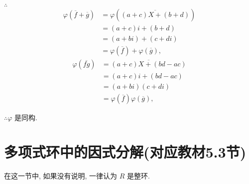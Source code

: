 \documentclass[UTF8]{ctexart}
\begin{document}
\begin{example}
    $\therefore$
    \begin{align*}
        \varphi(\overline{f}+\overline{g}) & =\varphi(\overline{(a+c)X+(b+d)}) \\
        & =(a+c)i+(b+d) \\
        & =(a+bi)+(c+di) \\
        & =\varphi(\overline{f})+\varphi(\overline{g}),
    \end{align*}
    \begin{align*}
        \varphi(\overline{fg}) & =\overline{(a+c)X+(bd-ac)} \\
        & =(a+c)i+(bd-ac) \\
        & =(a+bi)(c+di) \\
        & =\varphi(\overline{f})\varphi(\overline{g}),
    \end{align*}

    $\therefore\varphi$ 是同构.
\end{example}
\section{多项式环中的因式分解(对应教材5.3节)}
在这一节中, 如果没有说明, 一律认为 $R$ 是整环.
\end{document}
